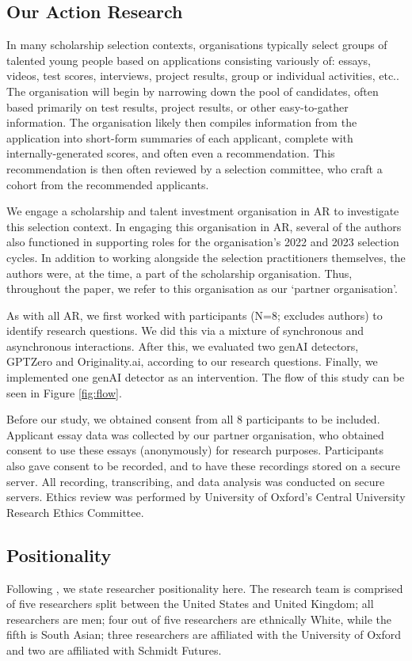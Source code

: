 \subsection{Our Action Research}
In many scholarship selection contexts, organisations typically select groups of talented young people based on applications consisting variously of: essays, videos, test scores, interviews, project results, group or individual activities, etc.. The organisation will begin by narrowing down the pool of candidates, often based primarily on test results, project results, or other easy-to-gather information. The organisation likely then compiles information from the application into short-form summaries of each applicant, complete with internally-generated scores, and often even a recommendation. This recommendation is then often reviewed by a selection committee, who craft a cohort from the recommended applicants.

We engage a scholarship and talent investment organisation in AR to investigate this selection context. In engaging this organisation in AR, several of the authors also functioned in supporting roles for the organisation's 2022 and 2023 selection cycles. In addition to working alongside the selection practitioners themselves, the authors were, at the time, a part of the scholarship organisation. Thus, throughout the paper, we refer to this organisation as our `partner organisation'. 

As with all AR, we first worked with participants (N=8; excludes authors) to identify research questions. We did this via a mixture of synchronous and asynchronous interactions. After this, we evaluated two genAI detectors, GPTZero and Originality.ai, according to our research questions. Finally, we implemented one genAI detector as an intervention. The flow of this study can be seen in Figure \ref{fig:flow}.

Before our study, we obtained consent from all 8 participants to be included. Applicant essay data was collected by our partner organisation, who obtained consent to use these essays (anonymously) for research purposes. Participants also gave consent to be recorded, and to have these recordings stored on a secure server. All recording, transcribing, and data analysis was conducted on secure servers. Ethics review was performed by University of Oxford's Central University Research Ethics Committee.

\subsection{Positionality}
Following \textcite{venn-wycherley_realities_2024}, we state researcher positionality here. The research team is comprised of five researchers split between the United States and United Kingdom; all researchers are men; four out of five researchers are ethnically White, while the fifth is South Asian; three researchers are affiliated with the University of Oxford and two are affiliated with Schmidt Futures.

